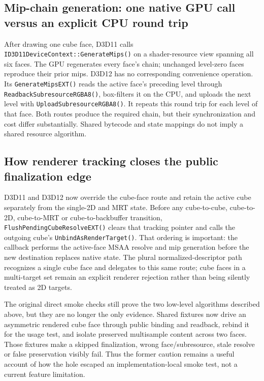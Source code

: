 \subsection{Mip-chain generation: one native GPU call versus an explicit CPU round trip}

After drawing one cube face, D3D11 calls
\texttt{ID3D11DeviceContext::GenerateMips()} on a shader-resource view spanning all six faces.
The GPU regenerates every face's chain; unchanged level-zero faces reproduce their prior mips.
D3D12 has no corresponding convenience operation. Its
\texttt{GenerateMipsEXT()} reads the active face's preceding level through
\texttt{ReadbackSubresourceRGBA8()}, box-filters it on the CPU, and uploads the next level with
\texttt{UploadSubresourceRGBA8()}. It repeats this round trip for each level of that face.
Both routes produce the required chain, but their synchronization and cost differ substantially.
Shared bytecode and state mappings do not imply a shared resource algorithm.

\subsection{How renderer tracking closes the public finalization edge}

D3D11 and D3D12 now override the cube-face route and retain the active cube separately from the
single-2D and MRT state. Before any cube-to-cube, cube-to-2D, cube-to-MRT or cube-to-backbuffer
transition, \texttt{FlushPendingCubeResolveEXT()} clears that tracking pointer and calls the
outgoing cube's \texttt{UnbindAsRenderTarget()}. That ordering is important: the callback performs
the active-face MSAA resolve and mip generation before the new destination replaces native state.
The plural normalized-descriptor path recognizes a single cube face and delegates to this same
route; cube faces in a multi-target set remain an explicit renderer rejection rather than being
silently treated as 2D targets.

The original direct smoke checks still prove the two low-level algorithms described above, but
they are no longer the only evidence. Shared  fixtures now drive an
asymmetric rendered cube face through public binding and readback, rebind it for the usage test,
and isolate preserved multisample content across two faces. Those fixtures make a skipped
finalization, wrong face/subresource, stale resolve or false preservation visibly fail. Thus the
former caution remains a useful account of how the hole escaped an implementation-local smoke
test, not a current feature limitation.

